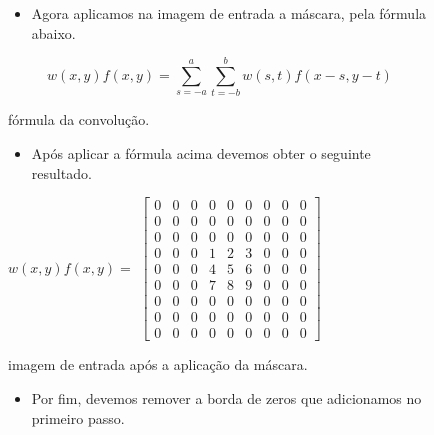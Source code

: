 \begin{figure}[!htb]
	\begin{itemize}
		\item Agora aplicamos na imagem de entrada a máscara, pela fórmula abaixo.
	\end{itemize}
\end{figure}

\begin{figure}[!htb]
	\begin{equation}
		w(x, y) f(x, y) = \sum_{s = -a} ^ {a} \sum_{t = -b} ^ {b} w(s, t) f(x - s, y - t)
	\end{equation}
	\caption{fórmula da convolução.}
\end{figure}

\pagebreak
\begin{figure}[H]
	\begin{itemize}
		\item Após aplicar a fórmula acima devemos obter o seguinte resultado.
	\end{itemize}
\end{figure}

\begin{figure}[H]
	\centering
	$ w(x, y) f(x, y) = $
	$
	\begin{bmatrix}
	    0 & 0 & 0 & 0 & 0 & 0 & 0 & 0 & 0 \\
	    0 & 0 & 0 & 0 & 0 & 0 & 0 & 0 & 0 \\
	    0 & 0 & 0 & 0 & 0 & 0 & 0 & 0 & 0 \\
	    0 & 0 & 0 & 1 & 2 & 3 & 0 & 0 & 0 \\
	    0 & 0 & 0 & 4 & 5 & 6 & 0 & 0 & 0 \\
	    0 & 0 & 0 & 7 & 8 & 9 & 0 & 0 & 0 \\
	    0 & 0 & 0 & 0 & 0 & 0 & 0 & 0 & 0 \\
	    0 & 0 & 0 & 0 & 0 & 0 & 0 & 0 & 0 \\
	    0 & 0 & 0 & 0 & 0 & 0 & 0 & 0 & 0
	\end{bmatrix}
	$
	\caption{imagem de entrada após a aplicação da máscara.}
\end{figure}

\begin{figure}[!htb]
	\begin{itemize}
		\item Por fim, devemos remover a borda de zeros que adicionamos no primeiro passo.
	\end{itemize}
\end{figure}

